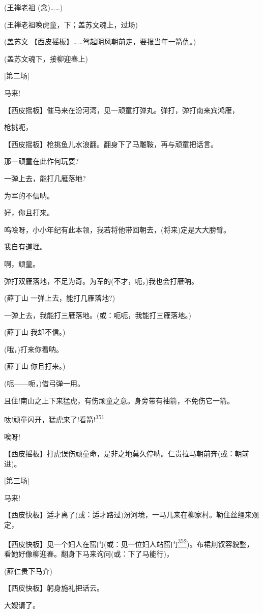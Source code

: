 (王禅老祖 (念)\ldots{}\ldots{})

(王禅老祖唤虎童，下；盖苏文魂上，过场)

(盖苏文 【西皮摇板】\ldots{}\ldots{}驾起阴风朝前走，要报当年一箭仇。)

(盖苏文魂下，接柳迎春上)

{[}第二场{]}

马来!

【西皮摇板】催马来在汾河湾，见一顽童打弹丸。弹打，弹打南来宾鸿雁，

枪挑呃，

【西皮摇板】枪挑鱼儿水浪翻。翻身下了马雕鞍，再与顽童把话言。

那一顽童在此作何玩耍?

一弹上去，能打几雁落地?

为军的不信呐。

好，你且打来。

呜哙呀，小小年纪有此本领，我若将他带回朝去，(将来)定是大大膀臂。

我自有道理。

啊，顽童。

弹打双雁落地，不足为奇。为军的(不才，呃，)我也会打雁呐。

(薛丁山 一弹上去，能打几雁落地?)

一弹上去，我能打三雁落地。(或：呃呃，我能打三雁落地。)

(薛丁山 我却不信。)

(哦，)打来你看呐。

(薛丁山 你且打来。)

(呃------呃，)借弓弹一用。

且住!南山之上下来猛虎，有伤顽童之意。身旁带有袖箭，不免伤它一箭。

呔!顽童闪开，猛虎来了!看箭!\protect\hyperlink{fn351}{\textsuperscript{351}}

唉呀!

【西皮摇板】打虎误伤顽童命，是非之地莫久停呐。仁贵拉马朝前奔(或：朝前进)。

{[}第三场{]}

马来!

【西皮快板】适才离了(或：适才路过)汾河境，一马儿来在柳家村。勒住丝缰来观定，

【西皮快板】见一个妇人在窑门(或：见一位妇人站窑门\protect\hyperlink{fn352}{\textsuperscript{352}})。布裙荆钗容貌整，看她好像柳迎春。翻身下马来询问(或：下了马能行)，

(薛仁贵下马介)

【西皮快板】躬身施礼把话云。

大嫂请了。

